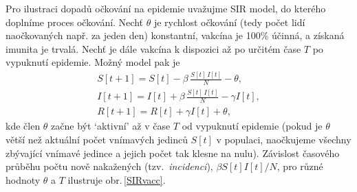 Pro ilustraci dopadů očkování na epidemie uvažujme SIR model, do kterého doplníme proces očkování. Nechť $\theta$ je rychlost očkování (tedy počet lidí naočkovaných např. za jeden den) konstantní, vakcína je 100\% účinná, a získaná imunita je trvalá. Nechť je dále vakcína k dispozici až po určitém čase $T$ po vypuknutí epidemie. Možný model pak je
\begin{equation}
\begin{array}{l}
\displaystyle{S[t+1] = S[t] - \beta \, \frac{S[t]\,I[t]}{N} - \theta}, \\[3ex]
\displaystyle{I[t+1] = I[t] + \beta \, \frac{S[t]\,I[t]}{N} - \gamma I[t]}, \\[3ex]
\displaystyle{R[t+1] = R[t] + \gamma I[t] + \theta},
\end{array}
\label{modSIRV}
\end{equation}
kde člen $\theta$ začne být `aktivní' až v čase $T$ od vypuknutí epidemie (pokud je $\theta$ větší než aktuální počet vnímavých jedinců $S[t]$ v populaci, naočkujeme všechny zbývající vnímavé jedince a jejich počet tak klesne na nulu). Závislost časového průběhu počtu nově nakažených (tzv.\ \emph{incidenci}), $\beta S[t] I[t]/N$, pro různé hodnoty $\theta$ a $T$ ilustruje obr.\,\ref{SIRvacc}.


